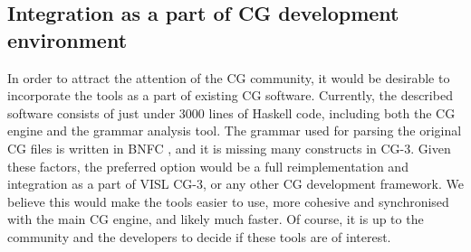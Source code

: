 {{%

\subsection{Integration as a part of CG development environment}

In order to attract the attention of the CG community, it would be desirable to incorporate the tools as a part of existing CG software. 
Currently, the described software consists of just under 3000 lines of Haskell code, including both the CG engine and the grammar analysis tool.
The grammar used for parsing the original CG files is written in BNFC \cite{bnfc}, and it is missing many constructs in CG-3. 
Given these factors, the preferred option would be a full reimplementation and integration as a part of VISL CG-3, or any other CG development framework. We believe this would make the tools easier to use, more cohesive and synchronised with the main CG engine, and likely much faster. Of course, it is up to the community and the developers to decide if these tools are of interest.










}}
